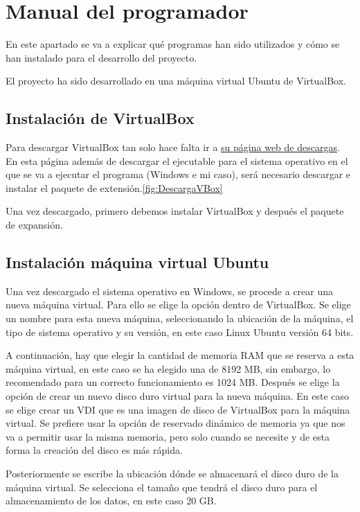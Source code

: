 \section{Manual del programador}
En este apartado se va a explicar qué programas han sido utilizados y cómo se han instalado para el desarrollo del proyecto.

El proyecto ha sido desarrollado en una máquina virtual Ubuntu de VirtualBox.

\subsection{Instalación de VirtualBox}
Para descargar VirtualBox tan solo hace falta ir a \href{https://www.virtualbox.org/wiki/Downloads}{su página web de descargas}. En esta página además de descargar el ejecutable para el sistema operativo en el que se va a ejecutar el programa (Windows e mi caso), será necesario descargar e instalar el paquete de extensión.\ref{fig:DescargaVBox}


Una vez descargado, primero debemos instalar VirtualBox y después el paquete de expansión.

\subsection{Instalación máquina virtual Ubuntu}
Una vez descargado el sistema operativo en Windows, se procede a crear una nueva máquina virtual. Para ello se elige la opción dentro de VirtualBox. Se elige un nombre para esta nueva máquina, seleccionando la ubicación de la máquina, el tipo de sistema operativo y su versión, en este caso Linux Ubuntu versión 64 bits.

A continuación, hay que elegir la cantidad de memoria RAM que se reserva a esta máquina virtual, en este caso se ha elegido una de 8192 MB, sin embargo, lo recomendado para un correcto funcionamiento es 1024 MB. Después se elige la opción de crear un nuevo disco duro virtual para la nueva máquina. En este caso se elige crear un VDI que es una imagen de disco de VirtualBox para la máquina virtual. Se prefiere usar la opción de reservado dinámico de memoria ya que nos va a permitir usar la misma memoria, pero solo cuando se necesite y de esta forma la creación del disco es más rápida.

Posteriormente se escribe la ubicación dónde se almacenará el disco duro de la máquina 
virtual. Se selecciona el tamaño que tendrá el disco duro para el almacenamiento de los datos, 
en este caso 20 GB.

